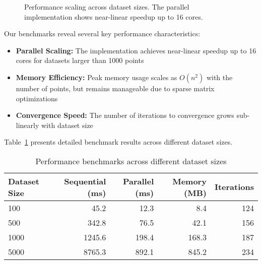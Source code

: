 \documentclass{article}
\begin{document}
\begin{figure}[htbp]
\centering
{}
\caption{Performance scaling across dataset sizes. The parallel implementation shows near-linear speedup up to 16 cores.}
\label{fig:performance}
\end{figure}

Our benchmarks reveal several key performance characteristics:

\begin{itemize}
    \item \textbf{Parallel Scaling:} The implementation achieves near-linear speedup up to 16 cores for datasets larger than 1000 points
    \item \textbf{Memory Efficiency:} Peak memory usage scales as $O(n^2)$ with the number of points, but remains manageable due to sparse matrix optimizations
    \item \textbf{Convergence Speed:} The number of iterations to convergence grows sub-linearly with dataset size
\end{itemize}

Table~\ref{tab:benchmarks} presents detailed benchmark results across different dataset sizes.

\begin{table}[htbp]
\centering
\begin{tabular}{lrrrr}
\toprule
Dataset Size & Sequential (ms) & Parallel (ms) & Memory (MB) & Iterations \\
\midrule
100         & 45.2           & 12.3         & 8.4        & 124       \\
500         & 342.8          & 76.5         & 42.1       & 156       \\
1000        & 1245.6         & 198.4        & 168.3      & 187       \\
5000        & 8765.3         & 892.1        & 845.2      & 234       \\
\bottomrule
\end{tabular}
\caption{Performance benchmarks across different dataset sizes}
\label{tab:benchmarks}
\end{table}
\end{document}
